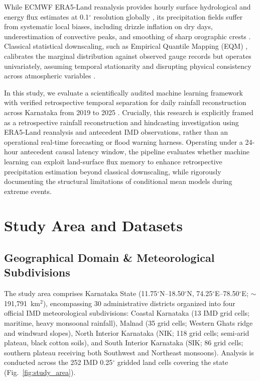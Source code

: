 \documentclass[pdflatex,sn-mathphys,Numbered]{sn-jnl}
\begin{document}
While ECMWF ERA5-Land reanalysis provides hourly surface hydrological and energy flux estimates at 0.1$^\circ$ resolution globally \cite{munoz2021, hersbach2020}, its precipitation fields suffer from systematic local biases, including drizzle inflation on dry days, underestimation of convective peaks, and smoothing of sharp orographic crests \cite{goswami2006}. Classical statistical downscaling, such as Empirical Quantile Mapping (EQM) \cite{piani2011}, calibrates the marginal distribution against observed gauge records but operates univariately, assuming temporal stationarity and disrupting physical consistency across atmospheric variables \cite{cannon2015}.

In this study, we evaluate a scientifically audited machine learning framework with verified retrospective temporal separation for daily rainfall reconstruction across Karnataka from 2019 to 2025 \cite{bano2020, reichstein2019}. Crucially, this research is explicitly framed as a retrospective rainfall reconstruction and hindcasting investigation using ERA5-Land reanalysis and antecedent IMD observations, rather than an operational real-time forecasting or flood warning harness. Operating under a 24-hour antecedent causal latency window, the pipeline evaluates whether machine learning can exploit land-surface flux memory to enhance retrospective precipitation estimation beyond classical downscaling, while rigorously documenting the structural limitations of conditional mean models during extreme events.

\section{Study Area and Datasets}\label{sec2}

\subsection{Geographical Domain \& Meteorological Subdivisions}
The study area comprises Karnataka State (11.75$^\circ$N--18.50$^\circ$N, 74.25$^\circ$E--78.50$^\circ$E; $\sim$191,791~km$^2$), encompassing 30 administrative districts organized into four official IMD meteorological subdivisions: Coastal Karnataka (13 IMD grid cells; maritime, heavy monsoonal rainfall), Malnad (35 grid cells; Western Ghats ridge and windward slopes), North Interior Karnataka (NIK; 118 grid cells; semi-arid plateau, black cotton soils), and South Interior Karnataka (SIK; 86 grid cells; southern plateau receiving both Southwest and Northeast monsoons). Analysis is conducted across the 252 IMD 0.25$^\circ$ gridded land cells covering the state (Fig.~\ref{fig:study_area}).
\end{document}
